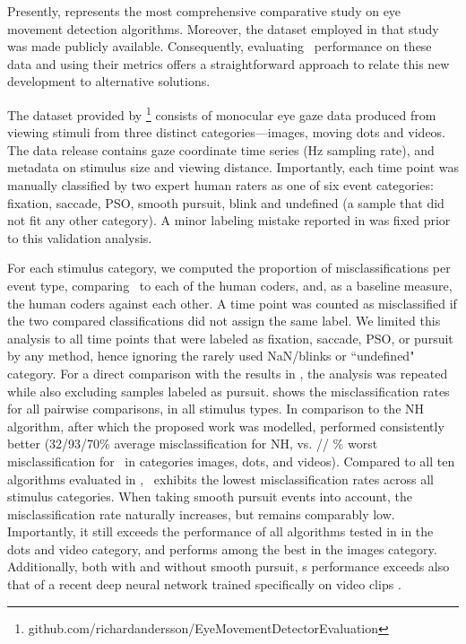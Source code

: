 Presently, \cite{Andersson2017} represents the most comprehensive comparative
study on eye movement detection algorithms. Moreover, the dataset employed
in that study was made publicly available. Consequently, evaluating \remodnav\
performance on these data and using their metrics offers a straightforward
approach to relate this new development to alternative solutions.

The dataset provided by
\cite{Andersson2017}\footnote{github.com/richardandersson/EyeMovementDetector\linebreak[0]Evaluation}
consists of monocular eye gaze data produced from viewing stimuli from three
distinct categories---images, moving dots and videos. The data release contains
gaze coordinate time series (\unit[500]{Hz} sampling rate), and metadata on
stimulus size and viewing distance.  Importantly, each time point was manually
classified by two expert human raters as one of six event categories: fixation,
saccade, PSO, smooth pursuit, blink and undefined (a sample that did not fit
any other category). A minor labeling mistake reported in \cite{Zemblys2018}
was fixed prior to this validation analysis.

For each stimulus category, we computed the proportion of misclassifications
per event type, comparing \remodnav\ to each of the human coders, and, as a
baseline measure, the human coders against each other.
%
A time point was counted as misclassified if the two compared classifications
did not assign the same label. We limited this analysis to all time points that
were labeled as fixation, saccade, PSO, or pursuit by any method, hence
ignoring the rarely used NaN/blinks or ``undefined" category. For a direct
comparison with the results in \cite{Andersson2017}, the analysis was repeated
while also excluding samples labeled as pursuit. \tab{mclf} shows the
misclassification rates for all pairwise comparisons, in all stimulus types.
In comparison to the NH algorithm, after which the proposed work was modelled,
\remodnav performed consistently better (32/93/70\% average misclassification for NH,
vs. \imgMNALMclfWOP/\dotsRAALMclfWOP/ \videoRAALMclfWOP\% worst
misclassification for \remodnav\ in categories images, dots, and videos). Compared to all ten
algorithms evaluated in \citet{Andersson2017}, \remodnav\ exhibits the lowest
misclassification rates across all stimulus categories.
%
When taking smooth pursuit events into account, the misclassification rate
naturally increases, but remains comparably low. Importantly, it still exceeds the
performance of all algorithms tested in \citet{Andersson2017} in the dots
and video category, and performs among the best in the images category.
Additionally, both with and without smooth pursuit, \remodnav s performance
exceeds also that of a recent deep neural network trained specifically on
video clips \citep[compare Table 7: 34\% misclassification versus \videoMNALMCLF\%
for \remodnav]{Startsev2018}.


